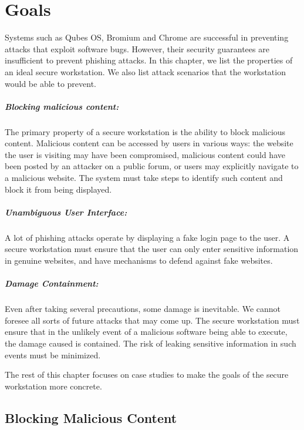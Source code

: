 \chapter{Goals} \label{chap:goals}

Systems such as Qubes OS, Bromium and Chrome are successful in preventing attacks that exploit software bugs. However, their security guarantees are insufficient to prevent phishing attacks. In this chapter, we list the properties of an ideal secure workstation. We also list attack scenarios that the workstation would be able to prevent.

\paragraph{Blocking malicious content:} The primary property of a secure workstation is the ability to block malicious content. Malicious content can be accessed by users in various ways: the website the user is visiting may have been compromised, malicious content could have been posted by an attacker on a public forum, or users may explicitly navigate to a malicious website. The system must take steps to identify such content and block it from being displayed.

\paragraph{Unambiguous User Interface:} A lot of phishing attacks operate by displaying a fake login page to the user. A secure workstation must ensure that the user can only enter sensitive information in genuine websites, and have mechanisms to defend against fake websites.

\paragraph{Damage Containment:} Even after taking several precautions, some damage is inevitable. We cannot foresee all sorts of future attacks that may come up. The secure workstation must ensure that in the unlikely event of a malicious software being able to execute, the damage caused is contained. The risk of leaking sensitive information in such events must be minimized.

The rest of this chapter focuses on case studies to make the goals of the secure workstation more concrete.

\section{Blocking Malicious Content}

